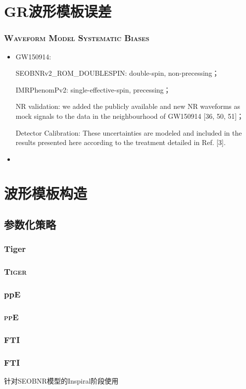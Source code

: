 \documentclass[CJK,aspectratio=169]{beamer}  %
\begin{document}
\section{GR波形模板误差}

\begin{frame}
	\frametitle{\textsc{Waveform Model Systematic Biases}}
	\begin{itemize}
		\item[1. ] GW150914\cite{test_GR_GW150914}: 
			\par SEOBNRv2\_ROM\_DOUBLESPIN: double-spin, non-precessing；
			\par IMRPhenomPv2: single-effective-spin, precessing；
			\par NR validation: we added the publicly available and new NR waveforms as mock signals to the data in the neighbourhood of GW150914 [36, 50, 51]；
			\par Detector Calibration: These uncertainties are modeled and included in the results presented here according to the treatment detailed in Ref. [3].
		\item[2. ]
	\end{itemize}
\end{frame}


\section{波形模板构造}

\subsection{参数化策略}
\subsubsection{Tiger}
\begin{frame}[allowframebreaks]
	\frametitle{\textsc{Tiger}}

\end{frame}

\subsubsection{ppE}
\begin{frame}[allowframebreaks]
	\frametitle{\textsc{ppE}}

\end{frame}

\subsubsection{FTI}
\begin{frame}[allowframebreaks]
	\frametitle{\textsc{FTI}}
	\par 针对SEOBNR模型的Inspiral阶段使用
\end{frame}
\end{document}
